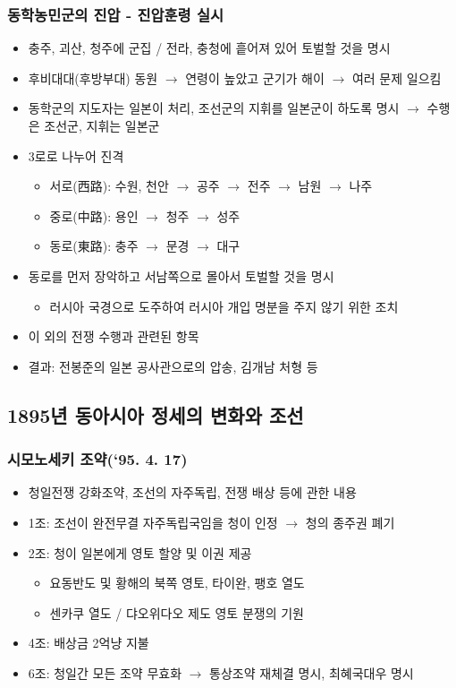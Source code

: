 \subsubsection*{동학농민군의 진압 - 진압훈령 실시}
\begin{itemize}
    \item 충주, 괴산, 청주에 군집 / 전라, 충청에 흩어져 있어 토벌할 것을 명시
    \item 후비대대(후방부대) 동원 $\rightarrow$ 연령이 높았고 군기가 해이 $\rightarrow$ 여러 문제 일으킴
    \item 동학군의 지도자는 일본이 처리, 조선군의 지휘를 일본군이 하도록 명시 $\rightarrow$ 수행은 조선군, 지휘는 일본군
    \item 3로로 나누어 진격
    \begin{itemize}
        \item 서로(西路): 수원, 천안 $\rightarrow$ 공주 $\rightarrow$ 전주 $\rightarrow$ 남원 $\rightarrow$ 나주
        \item 중로(中路): 용인 $\rightarrow$ 청주 $\rightarrow$ 성주
        \item 동로(東路): 충주 $\rightarrow$ 문경 $\rightarrow$ 대구
    \end{itemize}
    \item 동로를 먼저 장악하고 서남쪽으로 몰아서 토벌할 것을 명시
    \begin{itemize}
        \item 러시아 국경으로 도주하여 러시아 개입 명분을 주지 않기 위한 조치
    \end{itemize}
    \item 이 외의 전쟁 수행과 관련된 항목
    \item 결과: 전봉준의 일본 공사관으로의 압송, 김개남 처형 등
\end{itemize}

\subsection{1895년 동아시아 정세의 변화와 조선}

\subsubsection*{시모노세키 조약(`95. 4. 17)}
\begin{itemize}
    \item 청일전쟁 강화조약, 조선의 자주독립, 전쟁 배상 등에 관한 내용
    \item 1조: 조선이 완전무결 자주독립국임을 청이 인정 $\rightarrow$ 청의 종주권 폐기
    \item 2조: 청이 일본에게 영토 할양 및 이권 제공
    \begin{itemize}
        \item 요동반도 및 황해의 북쪽 영토, 타이완, 팽호 열도
        \item 센카쿠 열도 / 댜오위다오 제도 영토 분쟁의 기원
    \end{itemize}
    \item 4조: 배상금 2억냥 지불
    \item 6조: 청일간 모든 조약 무효화 $\rightarrow$ 통상조약 재체결 명시,
    최혜국대우 명시
\end{itemize}

